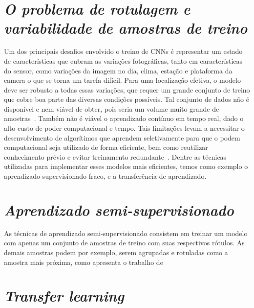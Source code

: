 \section{\textit{O problema de rotulagem e variabilidade de amostras de treino}}\label{sec:Cap2_MR}


Um dos principais desafios envolvido o treino de CNNs é representar um estado de características que cubram as variações fotográficas, tanto em características do sensor, como variações da imagem no dia, clima, estação e plataforma da camera o que se torna um tarefa difícil. Para uma localização efetiva, o modelo deve ser robusto a todas essas variações, que requer um grande conjunto de treino que cobre boa parte das diversas condições possíveis. Tal conjunto de dados não é disponível e nem viável de obter, pois seria um volume muito grande de amostras~\cite{rs13194017}. Também não é viável o aprendizado contínuo em tempo real, dado o alto custo de poder computacional e tempo. Tais limitações levam a necessitar o desenvolvimento de algorítimos que aprendem seletivamente para que o podem computacional seja utilizado de forma eficiente, bem como reutilizar conhecimento prévio e evitar treinamento redundante~\cite{rostami2019learning}.  Dentre as técnicas utilizadas para implementar esses modelos mais eficientes, temos como exemplo o aprendizado supervisionado fraco, e a transferência de aprendizado. 

\section{\textit{Aprendizado semi-supervisionado}}\label{sec:Cap2_MR}

As técnicas de aprendizado semi-supervisionado consistem em treinar um modelo com apenas um conjunto de amostras de treino com suas respectivos rótulos. As demais amostras podem por exemplo, serem agrupadas e rotuladas como a amostra mais próxima, como apresenta o trabalho de~\cite{Sanches2003}

\section{\textit{Transfer learning}}\label{sec:Cap2_MR}

